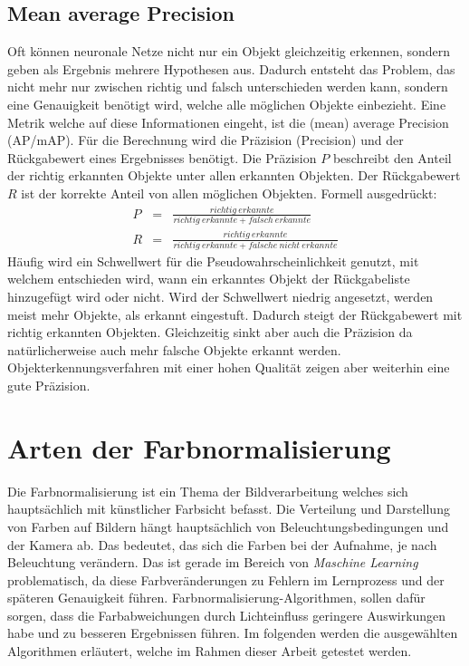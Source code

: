   \subsection{Mean average Precision}\label{s.map}
Oft können neuronale Netze nicht nur ein Objekt gleichzeitig erkennen, sondern geben als Ergebnis mehrere Hypothesen aus. Dadurch entsteht das Problem, das nicht mehr nur zwischen richtig und falsch unterschieden werden kann, sondern eine Genauigkeit benötigt wird, welche alle möglichen Objekte einbezieht. Eine Metrik welche auf diese Informationen eingeht, ist die (mean) average Precision (AP/mAP). Für die Berechnung wird die Präzision (Precision) und der Rückgabewert eines Ergebnisses benötigt. Die Präzision $P$ beschreibt den Anteil der richtig erkannten Objekte unter allen erkannten Objekten. Der Rückgabewert $R$ ist der korrekte Anteil von allen möglichen Objekten. Formell ausgedrückt:
\begin{eqnarray}
P&=&\frac{richtig\medspace erkannte}{richtig\medspace erkannte + falsch\medspace erkannte}\\
R&=&\frac{richtig\medspace erkannte}{richtig\medspace erkannte + falsche\medspace nicht\medspace erkannte}
\end{eqnarray}
Häufig wird ein Schwellwert für die Pseudowahrscheinlichkeit genutzt, mit welchem entschieden wird, wann ein erkanntes Objekt der Rückgabeliste hinzugefügt wird oder nicht. Wird der Schwellwert niedrig angesetzt, werden meist mehr Objekte, als erkannt eingestuft. Dadurch steigt der Rückgabewert mit richtig erkannten Objekten. Gleichzeitig sinkt aber auch die Präzision da natürlicherweise auch mehr falsche Objekte erkannt werden. Objekterkennungsverfahren mit einer hohen Qualität zeigen aber weiterhin eine gute Präzision.
\section{Arten der Farbnormalisierung}\label{s.farbnormalisierungen}  
Die Farbnormalisierung ist ein Thema der Bildverarbeitung welches sich hauptsächlich mit künstlicher Farbsicht befasst. Die Verteilung und Darstellung von Farben auf Bildern hängt hauptsächlich von Beleuchtungsbedingungen und der Kamera ab. Das bedeutet, das sich die Farben bei der Aufnahme, je nach Beleuchtung verändern. Das ist gerade im Bereich von \textit{Maschine Learning} problematisch, da diese Farbveränderungen zu Fehlern im Lernprozess und der späteren Genauigkeit führen. Farbnormalisierung-Algorithmen, sollen dafür sorgen, dass die Farbabweichungen durch Lichteinfluss geringere Auswirkungen habe und zu besseren Ergebnissen führen. Im folgenden werden die ausgewählten Algorithmen erläutert, welche im Rahmen dieser Arbeit getestet werden.
